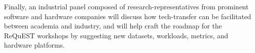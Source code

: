 \documentclass[10pt,letterpaper,twocolumn]{article}
\begin{document}
Finally, an industrial panel composed of research-representatives from
prominent software and hardware companies will discuss how
tech-transfer can be facilitated between academia and
industry, and will help craft the roadmap for the ReQuEST
workshops by suggesting new datasets, workloads, metrics, and
hardware platforms.




\end{document}
